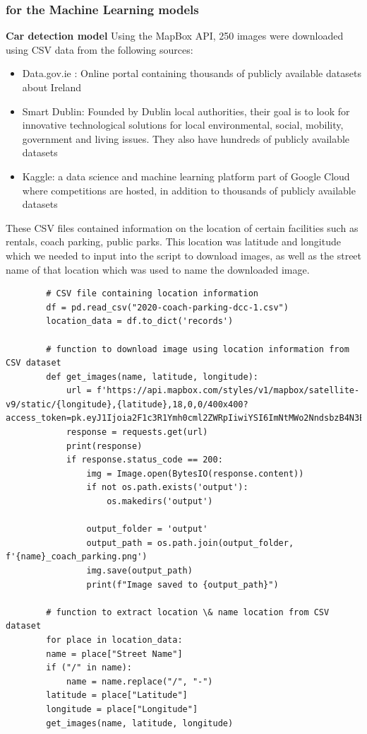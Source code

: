 \subsubsection{for the Machine Learning models}
\textbf{Car detection model}
Using the MapBox API, 250 images were downloaded using CSV data from the following sources:
\begin{itemize}
    \item Data.gov.ie : Online portal containing thousands of publicly available datasets about Ireland
    \item Smart Dublin: Founded by Dublin local authorities, their goal is to look for innovative technological solutions for local environmental, social, mobility, government and living issues. They also have hundreds of publicly available datasets
    \item Kaggle: a data science and machine learning platform part of Google Cloud where competitions are hosted, in addition to thousands of publicly available datasets
\end{itemize}
These CSV files contained information on the location of certain facilities such as rentals, coach parking, public parks. This location was latitude and longitude which we needed to input into the script to download images, as well as the street name of that location which was used to name the downloaded image.
\begin{listing}[h!]
    \centering
    \begin{verbatim}
        # CSV file containing location information
        df = pd.read_csv("2020-coach-parking-dcc-1.csv")
        location_data = df.to_dict('records')

        # function to download image using location information from CSV dataset
        def get_images(name, latitude, longitude):
            url = f'https://api.mapbox.com/styles/v1/mapbox/satellite-v9/static/{longitude},{latitude},18,0,0/400x400?access_token=pk.eyJ1Ijoia2F1c3R1Ymh0cml2ZWRpIiwiYSI6ImNtMWo2NndsbzB4N3EycHM1aGF2cDd5NzkifQ.4aegzX6Kfy3zW8pHkLWU7Q'
            response = requests.get(url)
            print(response)
            if response.status_code == 200:
                img = Image.open(BytesIO(response.content))
                if not os.path.exists('output'):
                    os.makedirs('output')

                output_folder = 'output'
                output_path = os.path.join(output_folder, f'{name}_coach_parking.png')
                img.save(output_path)
                print(f"Image saved to {output_path}")

        # function to extract location \& name location from CSV dataset
        for place in location_data:
        name = place["Street Name"]
        if ("/" in name):
            name = name.replace("/", "-")
        latitude = place["Latitude"]
        longitude = place["Longitude"]
        get_images(name, latitude, longitude)
    \end{verbatim}
\end{listing}\\
